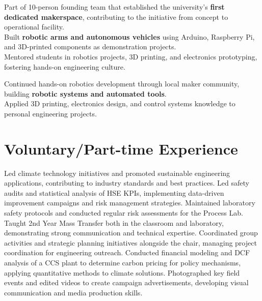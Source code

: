 \documentclass{../templates/karthicv-single}
\begin{document}
{Part of 10-person founding team that established the university's \textbf{first dedicated makerspace}, contributing to the initiative from concept to operational facility.\\
Built \textbf{robotic arms and autonomous vehicles} using Arduino, Raspberry Pi, and 3D-printed components as demonstration projects.\\
Mentored students in robotics projects, 3D printing, and electronics prototyping, fostering hands-on engineering culture.}

{Continued hands-on robotics development through local maker community, building \textbf{robotic systems and automated tools}.\\
Applied 3D printing, electronics design, and control systems knowledge to personal engineering projects.}

\section{Voluntary/Part-time Experience}

{Led climate technology initiatives and promoted sustainable engineering applications, contributing to industry standards and best practices.}
{Led safety audits and statistical analysis of HSE KPIs, implementing data-driven improvement campaigns and risk management strategies.}
{Maintained laboratory safety protocols and conducted regular risk assessments for the Process Lab.}
{Taught 2nd Year Mass Transfer both in the classroom and laboratory, demonstrating strong communication and technical expertise.}
{Coordinated group activities and strategic planning initiatives alongside the chair, managing project coordination for engineering outreach.}
{Conducted financial modeling and DCF analysis of a CCS plant to determine carbon pricing for policy mechanisms, applying quantitative methods to climate solutions.}
{Photographed key field events and edited videos to create campaign advertisements, developing visual communication and media production skills.}
\end{document}
